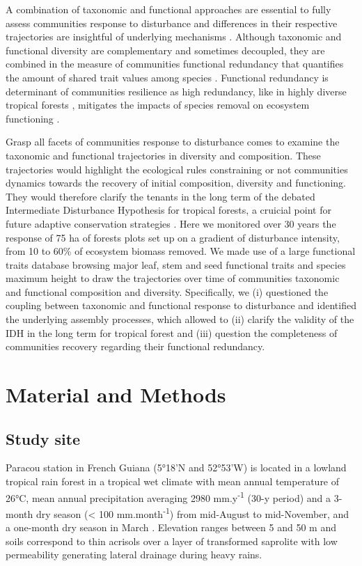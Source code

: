 \documentclass[fleqn,10pt]{ArtEcoFoG} %
\theoremstyle{definition}
\theoremstyle{definition}
\theoremstyle{definition}
\theoremstyle{remark}
\begin{document}
A combination of taxonomic and functional approaches are essential to
fully assess communities response to disturbance and differences in
their respective trajectories are insightful of underlying mechanisms
\citep{Lohbeck2015, Guariguata2001}. Although taxonomic and functional
diversity are complementary and sometimes decoupled, they are combined
in the measure of communities functional redundancy that quantifies the
amount of shared trait values among species \citep{Carmona2016}.
Functional redundancy is determinant of communities resilience as high
redundancy, like in highly diverse tropical forests
\citep{Bellwood2006}, mitigates the impacts of species removal on
ecosystem functioning \citep{Trenbath1999, Elmqvist2003, Diaz2005}.

Grasp all facets of communities response to disturbance comes to examine
the taxonomic and functional trajectories in diversity and composition.
These trajectories would highlight the ecological rules constraining or
not communities dynamics towards the recovery of initial composition,
diversity and functioning. They would therefore clarify the tenants in
the long term of the debated Intermediate Disturbance Hypothesis for
tropical forests, a cruicial point for future adaptive conservation
strategies \citep{Adler2007}. Here we monitored over 30 years the
response of 75 ha of forests plots set up on a gradient of disturbance
intensity, from 10 to 60\% of ecosystem biomass removed. We made use of
a large functional traits database browsing major leaf, stem and seed
functional traits and species maximum height to draw the trajectories
over time of communities taxonomic and functional composition and
diversity. Specifically, we (i) questioned the coupling between
taxonomic and functional response to disturbance and identified the
underlying assembly processes, which allowed to (ii) clarify the
validity of the IDH in the long term for tropical forest and (iii)
question the completeness of communities recovery regarding their
functional redundancy.

\section{Material and Methods}\label{material-and-methods}

\subsection{Study site}\label{study-site}

Paracou station in French Guiana (5°18'N and 52°53'W) is located in a
lowland tropical rain forest in a tropical wet climate with mean annual
temperature of 26°C, mean annual precipitation averaging 2980
mm.y\textsuperscript{-1} (30-y period) and a 3-month dry season
(\textless{} 100 mm.month\textsuperscript{-1}) from mid-August to
mid-November, and a one-month dry season in March \citep{Wagner2011}.
Elevation ranges between 5 and 50 m and soils correspond to thin
acrisols over a layer of transformed saprolite with low permeability
generating lateral drainage during heavy rains.
\end{document}
